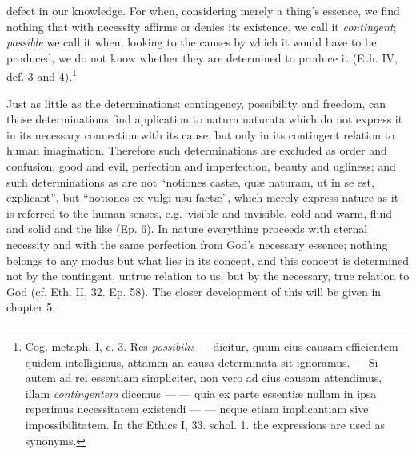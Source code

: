 \documentclass[12pt,a4paper,openany]{book}
\newcommand{\opage}[1]{\marginnote{\footnotesize\textit{[#1]}}}
\begin{document}
defect in our knowledge. For when, considering merely
a thing's essence, we find nothing that with necessity affirms
or denies its existence, we call it \emph{contingent}; \emph{possible}
we call it when, looking to the causes by which
it would have to be produced, we do not know whether they are determined to
produce it (Eth. IV, def. 3 and 4).\footnote{Cog. metaph. I,
c. 3. Res \textit{possibilis} --- dicitur, quum eius causam efficientem
quidem intelligimus, attamen an causa determinata sit ignoramus.
--- Si autem ad rei essentiam simpliciter, non vero ad eius
causam attendimus, illam \emph{contingentem} dicemus --- --- quia ex
parte essentiæ nullam in ipsa reperimus necessitatem existendi
--- --- neque etiam implicantiam sive impossibilitatem. In the Ethics
I, 33. schol. 1. the expressions are used as synonyms.}

Just as little as the determinations: contingency, possibility and
freedom, can those determinations find application to natura
naturata which do not express it in its necessary connection with
its cause, but only in its contingent relation to human
imagination. Therefore such determinations are excluded
as order and confusion, good and evil,
perfection and imperfection, beauty and ugliness; and
such determinations as are not ``notiones castæ, quæ
naturam, ut in se est, explicant'', but ``notiones ex vulgi usu
factæ'', which merely express nature as it is referred to
the human senses,
\opage{70}\setcounter{footnote}{0}e.g.\ visible and invisible, cold and warm, fluid and solid and the
like (Ep. 6). In nature everything proceeds with eternal necessity and
with the same perfection from God's necessary essence; nothing belongs
to any modus but what lies in its concept, and this
concept is determined not by the contingent, untrue relation to us,
but by the necessary, true relation to God (cf. Eth. II, 32.
Ep. 58). The closer development of this will be given in chapter 5.
\end{document}
